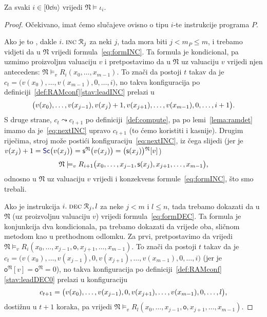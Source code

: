 \begin{lema}[{name=[istinitost instrukcijskih formula u $\mathfrak N$]}]\label{lm:Niotai}
Za svaki $i\in[0\dd n\rangle$ vrijedi $\mathfrak N\models\iota_i$.
\end{lema}
\begin{proof}
Očekivano, imat ćemo slučajeve ovisno o tipu $i$-te instrukcije programa $P$.

Ako je to \inc, dakle $i.\;\textsc{inc}\;\mathcal R_{j}$ za neki $j$, tada mora biti $j<m_P\le m$, i trebamo vidjeti da u $\mathfrak N$ vrijedi formula~\eqref{eq:formINC}. Ta formula je kondicional, pa uzmimo proizvoljnu valuaciju $v$ i pretpostavimo da u $\mathfrak N$ uz valuaciju $v$ vrijedi njen antecedens: $\mathfrak N\models_v R_i(x_0,\dotsc,x_{m-1})$. To znači da postoji $t$ takav da je $c_t=\bigl(v(x_0),\dotsc,v(x_{m-1}),0,\dotsc,i\bigr)$, no takva konfiguracija po definiciji~\ref{def:RAMconf}\eqref{stav:leadINC} prelazi u
\begin{equation}\label{eq:nextINC}
	\bigl(v(x_0),\dotsc,v(x_{j-1}),v(x_j)+1,v(x_{j+1}),\dotsc,v(x_{m-1}),0,\dotsc,i+1\bigr)\text.
\end{equation}
	S druge strane, $c_t\leadsto c_{t+1}$ po definiciji~\ref{def:compute}, pa po lemi~\ref{lema:ramdet} imamo da je~\eqref{eq:nextINC} upravo $c_{t+1}$ (to ćemo koristiti i kasnije). Drugim riječima, stroj može postići konfiguraciju~\eqref{eq:nextINC}, iz čega slijedi (jer je $v(x_j)+1=\f{Sc}\bigl(v(x_j)\bigr)=\mathsf s^{\mathfrak N}\bigl(v(x_j)\bigr)=\bigl(\mathsf s(x_j)\bigr){}^{\mathfrak N}[v]$)
\begin{equation}
    \mathfrak N\models_v R_{i+1}\bigl(x_0,\dotsc,x_{j-1},\mathsf s(x_j),x_{j+1},\dotsc,x_{m-1}\bigr)\text,
\end{equation}
odnosno u $\mathfrak N$ uz valuaciju $v$ vrijedi i konzekvens formule~\eqref{eq:formINC}, što smo trebali.

	Ako je instrukcija $i.\;\textsc{dec}\;\mathcal R_{j},l$ za neke $j<m$ i $l\le n$, tada trebamo dokazati da u $\mathfrak N$ (uz proizvoljnu valuaciju $v$) vrijedi formula~\eqref{eq:formDEC}. Ta formula je konjunkcija dva kondicionala, pa trebamo dokazati da vrijede oba, sličnom metodom kao u prethodnom odlomku. Za prvi, pretpostavimo da vrijedi $\mathfrak N\models_v R_i(x_0,\dotsc,x_{j-1},\mathsf o,x_{j+1},\dotsc,x_{m-1})$. To znači da postoji $t$ takav da je $c_t=\bigl(v(x_0),\dotsc,v(x_{j-1}),0,v(x_{j+1}),\dotsc,v(x_{m-1}),0,\dotsc,i\bigr)$ (jer je $\mathsf o^{\mathfrak N}[v]=\mathsf o^{\mathfrak N}=0$), no takva konfiguracija po definiciji~\ref{def:RAMconf}\eqref{stav:leadDEC0} prelazi u konfiguraciju
\begin{equation}
    c_{t+1}=\bigl(v(x_0),\dotsc,v(x_{j-1}),0,v(x_{j+1}),\dotsc,v(x_{m-1}),0,\dotsc,l\bigr)\text,
\end{equation}
dostižnu u $t+1$ koraka, pa vrijedi $\mathfrak N\models_v R_l(x_0,\dotsc,x_{j-1},\mathsf o,x_{j+1},\dotsc,x_{m-1})$.


\end{proof}
